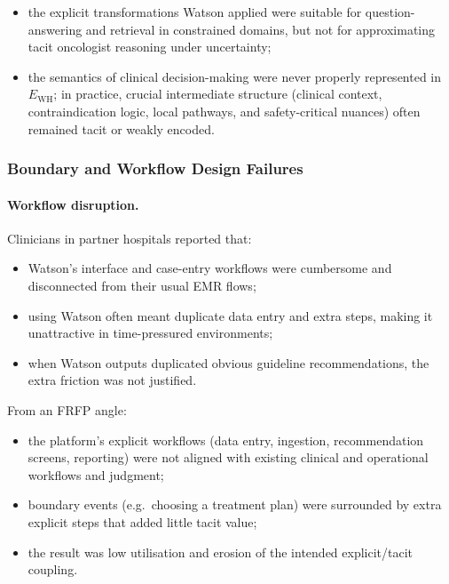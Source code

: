 \begin{itemize}
  \item the explicit transformations Watson applied were suitable for
        question-answering and retrieval in constrained domains, but not for
        approximating tacit oncologist reasoning under uncertainty;
  \item the semantics of clinical decision-making were never properly
represented in $E_{\mathrm{WH}}$; in practice, crucial intermediate
        structure (clinical context, contraindication logic, local pathways,
        and safety-critical nuances) often remained tacit or weakly encoded.
\end{itemize}

\subsubsection*{Boundary and Workflow Design Failures}

\paragraph{Workflow disruption.}
Clinicians in partner hospitals reported that:

\begin{itemize}
  \item Watson’s interface and case-entry workflows were cumbersome and
        disconnected from their usual EMR flows;
  \item using Watson often meant duplicate data entry and extra steps,
        making it unattractive in time-pressured environments;
  \item when Watson outputs duplicated obvious guideline recommendations,
        the extra friction was not justified.
\end{itemize}

From an FRFP angle:

\begin{itemize}
\item the platform’s explicit workflows (data entry, ingestion, recommendation screens, reporting)
        were not aligned with existing clinical and operational workflows and judgment;
  \item boundary events (e.g.\ choosing a treatment plan) were surrounded by
        extra explicit steps that added little tacit value;
  \item the result was low utilisation and erosion of the intended
        explicit/tacit coupling.
\end{itemize}

